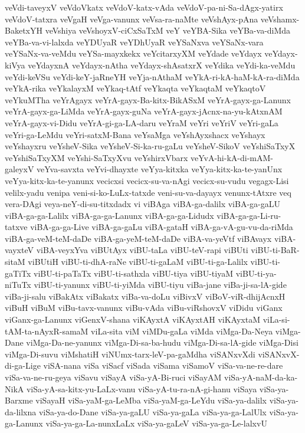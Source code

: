{veVdi-taveyxV
veVdoVkatx
veVdoV-katx-vAda
veVdoV-pa-ni-Sa-dAgx-yatirx
veVdoV-tatxra
veVgaH
veVga-vanunx
veVsa-ra-naMte
veVshAyx-pAna
veVshamx-BaketxYH
veVshiya
veVshoyxV-ciCxSaTxM
veY
veYBA-Sika
veYBa-va-diMda
veYBa-va-vi-lalxda
veYDUyaR
veYDhUyaR
veYSaNxva
veYSaNx-vara
veYSaNx-va-veMdu
veYSa-mayxkekx
veYcitarxyXM
veYdade
veYdayx
veYdayx-kiVya
veYdayxnA
veYdayx-nAtha
veYdayx-shAsatxrX
veYdika
veYdi-ka-veMdu
veYdi-keVSu
veYdi-keY-jaRneYH
veYja-nAthaM
veYkA-ri-kA-haM-kA-ra-diMda
veYkA-rika
veYkalayxM
veYkaq-tAtf
veYkaqta
veYkaqtaM
veYkaqtoV
veYkuMTha
veYrAgayx
veYrA-gayx-Ba-kitx-BikASxM
veYrA-gayx-ga-Lanunx
veYrA-gayx-ga-LiMda
veYrA-gayx-guNa
veYrA-gayx-jAcnx-na-yu-kAtxnAM
veYrA-gayx-vi-Didu
veYrA-gi-ga-LA-daru
veYraM
veYri
veYriV
veYri-gaLa
veYri-ga-LeMdu
veYri-satxM-Bana
veYsaMga
veYshAyxshacx
veYshayx
veYshayxru
veYsheV-Sika
veYsheV-Si-ka-ru-gaLu
veYsheV-SikoV
veYshiSaTxyX
veYshiSaTxyXM
veYshi-SaTxyXvu
veYshirxVbarx
veYvA-hi-kA-di-mAM-galeyxV
veYva-savxta
veYvi-dhayxte
veYya-kitxka
veYya-kitx-ka-te-yanUnx
veYya-kitx-ka-te-yanunx
vecicxsi
vecicx-su-va-nAgi
vecicx-su-vudu
vegagx-Lisi
velilx-yadu
venipa
veni-si-ko-LuLx-tatxde
veni-su-va-dayayx
venunx-tAtxre
veq
vera-DAgi
veya-neY-di-su-titxdadx
vi
viBAga
viBA-ga-dalilx
viBA-ga-gaLU
viBA-ga-ga-Lalilx
viBA-ga-ga-Lanunx
viBA-ga-ga-Lidudx
viBA-ga-ga-Li-ru-tatxve
viBA-ga-ga-Live
viBA-ga-gaLu
viBA-gataH
viBA-ga-vA-gu-vu-da-riMda
viBA-ga-veM-teM-daDe
viBA-ga-yeM-teM-daDe
viBA-va-yeVtf
viBAvayx
viBA-vayxteV
viBA-veyxYva
viBUtAyx
viBU-taLa
viBU-teV-rapi
viBUti
viBU-ti-BaR-sitaM
viBUtiH
viBU-ti-dhA-raNe
viBU-ti-gaLaM
viBU-ti-ga-Lalilx
viBU-ti-gaTiTx
viBU-ti-paTaTx
viBU-ti-sathxla
viBU-tiya
viBU-tiyaM
viBU-ti-ya-niTuTx
viBU-ti-yanunx
viBU-ti-yiMda
viBU-tiyu
viBa-jane
viBa-ji-sa-lA-gide
viBa-ji-salu
viBakAtx
viBakatx
viBa-va-doLu
viBivxV
viBoV-viR-dhijAcnxH
viBuH
viBuM
viBu-tavx-vanunx
viBu-vAda
viBu-viRshovxV
viDidu
viGanx
viGanx-ga-Lanunx
viGenxV-shana
viKAyxtA
viKAyxtAH
viKAyxtaM
viLa-si-tAM-ta-nAyxR-samaM
viLa-sita
viM
viMDu-gaLa
viMda
viMga-Da-Neya
viMga-Dane
viMga-Da-ne-yanunx
viMga-Di-sa-ba-hudu
viMga-Di-sa-lA-gide
viMga-Disi
viMga-Di-suvu
viMshatiH
viNUmx-tarx-leV-pa-gaMdha
viSANxvXdi
viSANxvX-di-ga-Lige
viSA-nana
viSa
viSacf
viSada
viSama
viSamoV
viSa-va-ne-re-dare
viSa-va-ne-ru-geya
viSavu
viSayA
viSa-yA-Bi-ruci
viSayAM
viSa-yA-naM-da-ka-NikA
viSa-yA-sa-kitx-yu-LaLx-vanu
viSa-yA-tu-ra-nA-gi-hanu
viSaya
viSa-ya-Barxme
viSayaH
viSa-yaM-ga-LeMba
viSa-yaM-ga-LeYdu
viSa-ya-dalilx
viSa-ya-da-lilxna
viSa-ya-do-Dane
viSa-ya-gaLU
viSa-ya-gaLa
viSa-ya-ga-LalUlx
viSa-ya-ga-Lanunx
viSa-ya-ga-La-nunxLaLx
viSa-ya-gaLeV
viSa-ya-ga-Le-lalxvU
}
